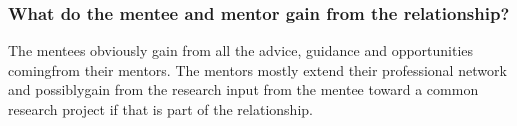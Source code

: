 \documentclass{beamer}
\begin{document}
\begin{frame} %

\frametitle{What do the mentee and mentor gain from the relationship?}

The mentees obviously gain from all the advice,  guidance and opportunities comingfrom their mentors. The mentors mostly extend their professional network and possiblygain from the research input from the mentee toward a common research project if that is part of the relationship.





\end{frame}
\end{document}
